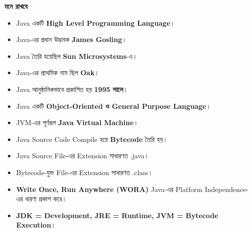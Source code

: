 \begin{rememberbox}

\textbf{\color{deepOrange}মনে রাখবে}

\begin{itemize}

\item Java একটি \textbf{High Level Programming Language}।

\item Java-এর প্রধান উদ্ভাবক \textbf{James Gosling}।

\item Java তৈরি হয়েছিল \textbf{Sun Microsystems}-এ।

\item Java-এর প্রাথমিক নাম ছিল \textbf{Oak}।

\item Java আনুষ্ঠানিকভাবে প্রকাশিত হয় \textbf{1995 সালে}।

\item Java একটি \textbf{Object-Oriented ও General Purpose Language}।

\item JVM-এর পূর্ণরূপ \textbf{Java Virtual Machine}।

\item Java Source Code Compile হয়ে \textbf{Bytecode} তৈরি হয়।

\item Java Source File-এর Extension সাধারণত
\textenglish{\ttfamily .java}।

\item Bytecode-যুক্ত File-এর Extension সাধারণত
\textenglish{\ttfamily .class}।

\item \textbf{Write Once, Run Anywhere (WORA)} Java-এর
Platform Independence-এর ধারণা প্রকাশ করে।

\item \textbf{JDK = Development, JRE = Runtime, JVM = Bytecode Execution}।

\end{itemize}

\end{rememberbox}

\small

